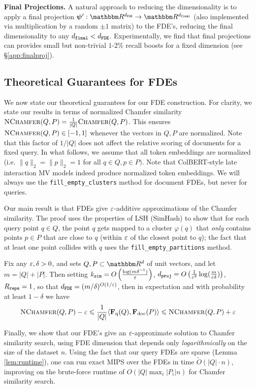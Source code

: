 \textbf{Final Projections.} A natural approach to reducing the dimensionality is to apply a final projection  $\bpsi':\R^{\dfde} \to \R^{\dfinal}$ (also implemented via multiplication by a random $\pm 1$ matrix) to the FDE's, reducing the final dimensionality to any $d_{\texttt{final}} < d_{\texttt{FDE}}$. 
Experimentally, we find that final projections can provides small but non-trivial $1$-$2\%$ recall boosts for a fixed dimension (see  §\ref{app:finalproj}).


\subsection{Theoretical Guarantees for FDEs}
\label{sec:fde-theory}

We now state our theoretical guarantees for our FDE construction. For clarity, we state our results in terms of normalized Chamfer similarity $\textsc{NChamfer}(Q,P) = \frac{1}{|Q|}\textsc{Chamfer}(Q,P)$. This ensures $\textsc{NChamfer}(Q,P) \in [-1,1]$ whenever the vectors in $Q,P$ are normalized. Note that this factor of $1/|Q|$ does not affect the relative scoring of documents for a fixed query. 
In what follows, we assume that all token embeddings are normalized (i.e. $\|q\|_2 = \|p\|_2 = 1$ for all $q \in Q, p \in P)$. Note that ColBERT-style late interaction MV models indeed produce normalized token embeddings. We will always use the \texttt{fill\_empty\_clusters} method for document FDEs, but never for queries. 


Our main result is that FDEs give $\varepsilon$-additive approximations of the Chamfer similarity. The proof uses the properties of LSH (SimHash) to show that for each query point $q \in Q$, the point $q$ gets mapped to a cluster $\varphi(q)$ that \emph{only} contains points $p \in P$ that are close to $q$ (within $\varepsilon$ of the closest point to $q$); the fact that at least one point collides with $q$ uses the \texttt{fill\_empty\_partitions} method. 

\begin{theorem}\label{thm:FDE-approx}
Fix any $\varepsilon ,\delta > 0$, and sets $Q,P \subset \R^d$ of unit vectors, and let $m=|Q| + |P|$. 
Then setting $k_{\texttt{sim}} = O\left(\frac{\log (m\delta^{-1})}{\varepsilon}\right)$, $d_{\texttt{proj}} = O\left(\frac{1}{\varepsilon^2}  \log (\frac{m}{\varepsilon\delta})\right)$, $R_{\texttt{reps}} = 1$, so that $d_{\texttt{FDE}} = (m/\delta)^{O(1/\varepsilon)}$, %
then in expectation and with probability at least $1-\delta$ we have
 \[  \textsc{NChamfer}(Q,P)  - \varepsilon \leqslant \frac{1}{|Q|}\langle \mathbf{F}_{\text{q}}(Q) , \mathbf{F}_{\text{doc}}(P) \rangle \leqslant  \textsc{NChamfer}(Q,P) + \varepsilon  \]
\end{theorem}
Finally, we show that our FDE's give an $\varepsilon$-approximate solution to Chamfer similarity search, using FDE dimension that depends only \emph{logarithmically} on the size of the dataset $n$. Using the fact that our query FDEs are sparse (Lemma \ref{lem:runtime}), one can run exact MIPS over the FDEs in time $\tilde{O}(|Q|\cdot n)$, improving on the brute-force runtime of $O(|Q| \max_i|P_i| n)$ for Chamfer similarity search.


